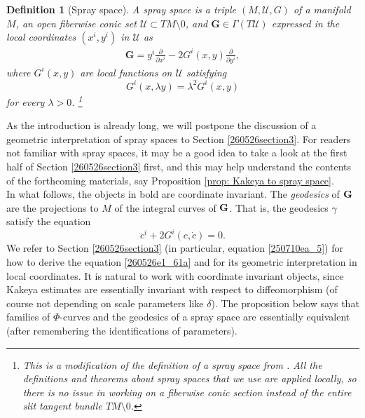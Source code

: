 \documentclass{article}
\numberwithin{equation}{section}
\theoremstyle{plain}
\newtheorem{definition}[theorem]{Definition}
\begin{document}
\begin{definition}[Spray space]\label{260526defi1_19}
    A spray space is a triple $(M, \mathcal U, G)$ of a manifold $M$, an open fiberwise conic set $\mathcal U \subset TM \setminus 0$, and $\mathbf G \in \Gamma(T\mathcal U)$ expressed in the local coordinates $(x^i,y^i)$ in $\mathcal U$ as 
    \begin{align}
        \mathbf{G} = y^i \frac{\partial}{\partial x^i} - 2 G^i(x,y) \frac{\partial}{\partial y^i},
    \end{align}
    where $G^i(x,y)$ are local functions on $\mathcal U$ satisfying
    \begin{equation}\label{260526e1_60zz}
    G^i(x,\lambda y) = \lambda^2 G^i(x,y)
    \end{equation}
for every     $\lambda > 0$. \footnote{This is a modification of the definition of a spray space from \cite{Shen01}. All the definitions and theorems about spray spaces that we use are applied locally, so there is no issue in working on a fiberwise conic section instead of the entire slit tangent bundle $TM \setminus 0$.}
\end{definition}


As the introduction is already long, we will postpone the discussion of a geometric interpretation of spray spaces to Section \ref{260526section3}. For readers not familiar with spray spaces, it may be a good idea to take a look at the first half of Section \ref{260526section3} first, and this may help understand the contents of the forthcoming materials, say Proposition \ref{prop: Kakeya to spray space}. \\


In what follows, the objects in bold are coordinate invariant. 
The \emph{geodesics} of $\bf G$ are the projections to $M$ of the integral curves of $\bf G$. That is, the geodesics $\gamma$ satisfy the equation 
\begin{equation}\label{260526e1_61a}
\ddot c^i + 2 G^i(c,\dot c)=0.
\end{equation}
We refer to Section \ref{260526section3} (in particular, equation \eqref{250710ea_5}) for 
how to derive the equation \eqref{260526e1_61a} and for its geometric interpretation in local coordinates.  It is natural to work with coordinate invariant objects, since Kakeya estimates are essentially invariant with respect to diffeomorphism (of course not depending on scale parameters like $\delta$). 
The proposition below says that families of $\Phi$-curves and the geodesics of a spray space are essentially equivalent (after remembering the identifications of parameters).  
\end{document}
